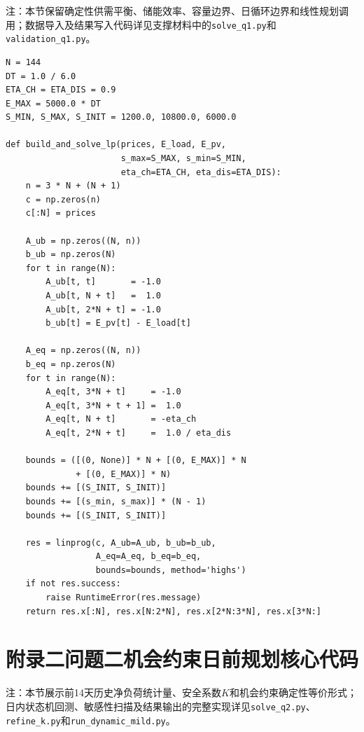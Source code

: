 \documentclass{cumcmthesis}
\begin{document}
注：本节保留确定性供需平衡、储能效率、容量边界、日循环边界和线性规划调用；数据导入及结果写入代码详见支撑材料中的\texttt{solve\_q1.py}和\texttt{validation\_q1.py}。

\begin{lstlisting}[caption={问题一确定性线性规划核心代码节选},label={lst:q1_core}]
N = 144
DT = 1.0 / 6.0
ETA_CH = ETA_DIS = 0.9
E_MAX = 5000.0 * DT
S_MIN, S_MAX, S_INIT = 1200.0, 10800.0, 6000.0

def build_and_solve_lp(prices, E_load, E_pv,
                       s_max=S_MAX, s_min=S_MIN,
                       eta_ch=ETA_CH, eta_dis=ETA_DIS):
    n = 3 * N + (N + 1)
    c = np.zeros(n)
    c[:N] = prices

    A_ub = np.zeros((N, n))
    b_ub = np.zeros(N)
    for t in range(N):
        A_ub[t, t]       = -1.0
        A_ub[t, N + t]   =  1.0
        A_ub[t, 2*N + t] = -1.0
        b_ub[t] = E_pv[t] - E_load[t]

    A_eq = np.zeros((N, n))
    b_eq = np.zeros(N)
    for t in range(N):
        A_eq[t, 3*N + t]     = -1.0
        A_eq[t, 3*N + t + 1] =  1.0
        A_eq[t, N + t]       = -eta_ch
        A_eq[t, 2*N + t]     =  1.0 / eta_dis

    bounds = ([(0, None)] * N + [(0, E_MAX)] * N
              + [(0, E_MAX)] * N)
    bounds += [(S_INIT, S_INIT)]
    bounds += [(s_min, s_max)] * (N - 1)
    bounds += [(S_INIT, S_INIT)]

    res = linprog(c, A_ub=A_ub, b_ub=b_ub,
                  A_eq=A_eq, b_eq=b_eq,
                  bounds=bounds, method='highs')
    if not res.success:
        raise RuntimeError(res.message)
    return res.x[:N], res.x[N:2*N], res.x[2*N:3*N], res.x[3*N:]
\end{lstlisting}

\section*{附录二\quad 问题二机会约束日前规划核心代码}

注：本节展示前14天历史净负荷统计量、安全系数$K$和机会约束确定性等价形式；日内状态机回测、敏感性扫描及结果输出的完整实现详见\texttt{solve\_q2.py}、\texttt{refine\_k.py}和\texttt{run\_dynamic\_mild.py}。
\end{document}
